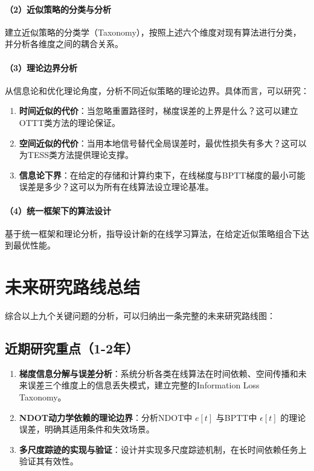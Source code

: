 \documentclass[journal,12pt,onecolumn]{IEEEtran}
\begin{document}
\paragraph{（2）近似策略的分类与分析}
建立近似策略的分类学（Taxonomy），按照上述六个维度对现有算法进行分类，并分析各维度之间的耦合关系。

\paragraph{（3）理论边界分析}
从信息论和优化理论角度，分析不同近似策略的理论边界。具体而言，可以研究：

\begin{enumerate}
    \item \textbf{时间近似的代价}：当忽略重置路径时，梯度误差的上界是什么？这可以建立OTTT类方法的理论保证。
    \item \textbf{空间近似的代价}：当用本地信号替代全局误差时，最优性损失有多大？这可以为TESS类方法提供理论支撑。
    \item \textbf{信息论下界}：在给定的存储和计算约束下，在线梯度与BPTT梯度的最小可能误差是多少？这可以为所有在线算法设立理论基准。
\end{enumerate}

\paragraph{（4）统一框架下的算法设计}
基于统一框架和理论分析，指导设计新的在线学习算法，在给定近似策略组合下达到最优性能。

\section{未来研究路线总结}

综合以上九个关键问题的分析，可以归纳出一条完整的未来研究路线图：

\subsection{近期研究重点（1-2年）}

\begin{enumerate}
    \item \textbf{梯度信息分解与误差分析}：系统分析各类在线算法在时间依赖、空间传播和未来误差三个维度上的信息丢失模式，建立完整的Information Loss Taxonomy。
    \item \textbf{NDOT动力学依赖的理论边界}：分析NDOT中 \(e[t]\) 与BPTT中 \(\epsilon[t]\) 的理论误差，明确其适用条件和失效场景。
    \item \textbf{多尺度踪迹的实现与验证}：设计并实现多尺度踪迹机制，在长时间依赖任务上验证其有效性。
\end{enumerate}
\end{document}
